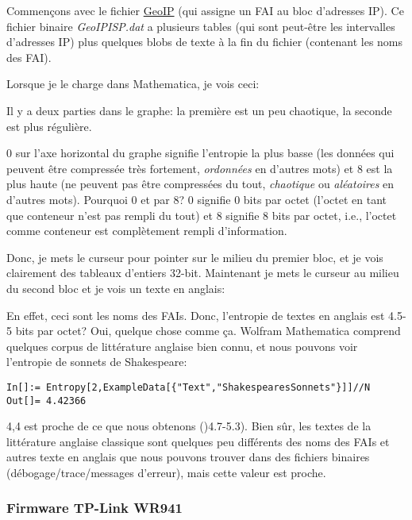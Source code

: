Commençons avec le fichier \href{https://www.maxmind.com/en/geoip-demo}{GeoIP} (qui
assigne un FAI au bloc d'adresses IP).
Ce fichier binaire \emph{GeoIPISP.dat} a plusieurs tables (qui sont peut-être les
intervalles d'adresses IP) plus quelques blobs de texte à la fin du fichier (contenant
les noms des FAI).

Lorsque je le charge dans Mathematica, je vois ceci:



Il y a deux parties dans le graphe: la première est un peu chaotique, la seconde
est plus régulière.

0 sur l'axe horizontal du graphe signifie l'entropie la plus basse (les données
qui peuvent être compressée très fortement, \emph{ordonnées} en d'autres mots) et 8
est la plus haute (ne peuvent pas être compressées du tout, \emph{chaotique}
ou \emph{aléatoires} en d'autres mots).
Pourquoi 0 et par 8? 0 signifie 0 bits par octet (l'octet en tant que conteneur
n'est pas rempli du tout) et 8 signifie 8 bits par octet, i.e., l'octet comme
conteneur est complètement rempli d'information.

Donc, je mets le curseur pour pointer sur le milieu du premier bloc, et je vois clairement
des tableaux d'entiers 32-bit.
Maintenant je mets le curseur au milieu du second bloc et je vois un texte en anglais:



En effet, ceci sont les noms des FAIs.
Donc, l'entropie de textes en anglais est 4.5-5 bits par octet? Oui, quelque chose
comme ça.
Wolfram Mathematica comprend quelques corpus de littérature anglaise bien connu,
et nous pouvons voir l'entropie de sonnets de Shakespeare:

\begin{lstlisting}[style=custommath]
In[]:= Entropy[2,ExampleData[{"Text","ShakespearesSonnets"}]]//N
Out[]= 4.42366
\end{lstlisting}

4,4 est proche de ce que nous obtenons ()4.7-5.3).
Bien sûr, les textes de la littérature anglaise classique sont quelques peu différents
des noms des FAIs et autres texte en anglais que nous pouvons trouver dans des fichiers
binaires (débogage/trace/messages d'erreur), mais cette valeur est proche.

\subsubsection{Firmware TP-Link WR941 }

